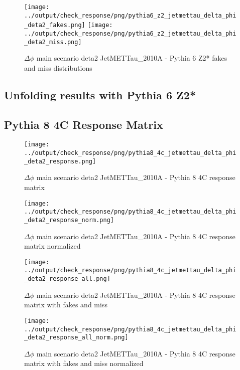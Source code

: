\documentclass[11pt]{book}
\begin{document}
\begin{figure}[ht]
\centering
\texttt{[image: ../output/check\_response/png/pythia6\_z2\_jetmettau\_delta\_phi\_deta2\_fakes.png]}
\texttt{[image: ../output/check\_response/png/pythia6\_z2\_jetmettau\_delta\_phi\_deta2\_miss.png]}
\caption{$\Delta\phi$ main scenario deta2 JetMETTau\_2010A - Pythia 6 Z2* fakes and miss distributions}
\label{p6_jetmettau_delta_phi_deta2_fakesmiss}
\end{figure}


\clearpage
\subsection{Unfolding results with Pythia 6 Z2*}


\clearpage
\subsection{Pythia 8 4C Response Matrix}


\begin{figure}[ht]
\centering
\texttt{[image: ../output/check\_response/png/pythia8\_4c\_jetmettau\_delta\_phi\_deta2\_response.png]}
\caption{$\Delta\phi$ main scenario deta2 JetMETTau\_2010A - Pythia 8 4C response matrix}
\label{p8_jetmettau_delta_phi_deta2_response}
\end{figure}

\begin{figure}[ht]
\centering
\texttt{[image: ../output/check\_response/png/pythia8\_4c\_jetmettau\_delta\_phi\_deta2\_response\_norm.png]}
\caption{$\Delta\phi$ main scenario deta2 JetMETTau\_2010A - Pythia 8 4C response matrix normalized}
\label{p8_jetmettau_delta_phi_deta2_response_norm}
\end{figure}

\begin{figure}[ht]
\centering
\texttt{[image: ../output/check\_response/png/pythia8\_4c\_jetmettau\_delta\_phi\_deta2\_response\_all.png]}
\caption{$\Delta\phi$ main scenario deta2 JetMETTau\_2010A - Pythia 8 4C response matrix with fakes and miss}
\label{p8_jetmettau_delta_phi_deta2_response_all}
\end{figure}

\begin{figure}[ht]
\centering
\texttt{[image: ../output/check\_response/png/pythia8\_4c\_jetmettau\_delta\_phi\_deta2\_response\_all\_norm.png]}
\caption{$\Delta\phi$ main scenario deta2 JetMETTau\_2010A - Pythia 8 4C response matrix with fakes and miss normalized}
\label{p8_jetmettau_delta_phi_deta2_response_all_norm}
\end{figure}
\end{document}
